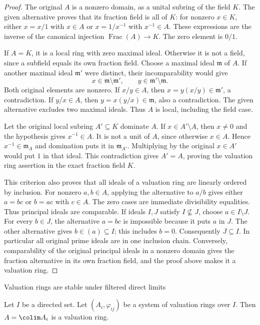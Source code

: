 \begin{proof}
The original $A$ is a nonzero
domain, as a unital subring
of the field $K$. The given
alternative proves that its
fraction field is all of $K$:
for nonzero $x\in K$, either
$x=x/1$ with $x\in A$ or
$x=1/x^{-1}$ with $x^{-1}\in A$.
These expressions are the
inverse of the canonical
injection $\operatorname{Frac}(A)\to K$.
The zero element is $0/1$.

If $A=K$, it is a local
ring with zero maximal ideal.
Otherwise it is not a field,
since a subfield equals its
own fraction field. Choose
a maximal ideal $\mathfrak m$
of $A$. If another maximal
ideal $\mathfrak m'$ were
distinct, their incomparability
would give
$$
x\in\mathfrak m\setminus\mathfrak m',\qquad
y\in\mathfrak m'\setminus\mathfrak m.
$$
Both original elements are
nonzero. If $x/y\in A$,
then $x=y(x/y)\in\mathfrak m'$,
a contradiction. If $y/x\in A$,
then $y=x(y/x)\in\mathfrak m$,
also a contradiction. The
given alternative excludes
two maximal ideals. Thus
$A$ is local, including
the field case.

Let the original local subring
$A'\subseteq K$ dominate $A$.
If $x\in A'\setminus A$,
then $x\neq0$ and the
hypothesis gives $x^{-1}\in A$.
It is not a unit of $A$,
since otherwise $x\in A$.
Hence $x^{-1}\in\mathfrak m_A$
and domination puts it in
$\mathfrak m_{A'}$. Multiplying
by the original $x\in A'$
would put $1$ in that ideal.
This contradiction gives
$A'=A$, proving the valuation
ring assertion in the exact
fraction field $K$.

This criterion also proves
that all ideals of a valuation
ring are linearly ordered
by inclusion. For nonzero
$a,b\in A$, applying the
alternative to $a/b$ gives
either $a=bc$ or $b=ac$
with $c\in A$. The zero
cases are immediate divisibility
equalities. Thus principal
ideals are comparable. If
ideals $I,J$ satisfy
$I\not\subseteq J$, choose
$a\in I\setminus J$.
For every $b\in J$, the
alternative $a=bc$ is
impossible because it puts
$a$ in $J$. The other
alternative gives $b\in(a)\subseteq I$;
this includes $b=0$.
Consequently $J\subseteq I$.
In particular all original
prime ideals are in one
inclusion chain. Conversely,
comparability of the original
principal ideals in a nonzero
domain gives the fraction
alternative in its own
fraction field, and the proof
above makes it a valuation ring.
\end{proof}

\begin{lemma}
\label{editorial-source-lemma-colimit-valuation-rings}
\begin{slogan}
Valuation rings are stable under filtered direct limits
\end{slogan}
Let $I$ be a directed set. Let $(A_i, \varphi_{ij})$
be a system of valuation rings over $I$.
Then $A = \colim A_i$ is a valuation ring.
\end{lemma}

